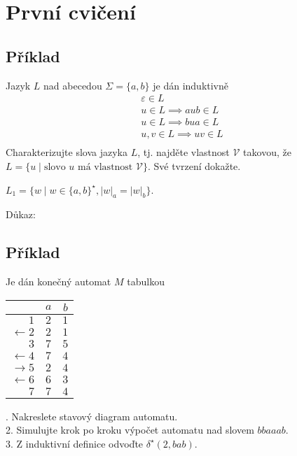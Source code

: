\section{První cvičení}

\subsection{Příklad}
Jazyk $L$ nad abecedou $\Sigma = \{a,b\}$ je dán induktivně
\begin{gather*}
    \varepsilon \in L \\
    u \in L \implies aub \in L\\
    u \in L \implies bua \in L\\
    u, v \in L \implies uv \in L\\
\end{gather*}
Charakterizujte slova jazyka $L$, tj. najděte vlastnost $\mathcal{V}$ takovou, že $L = \{u \mid \text{slovo } u 
\text{ má vlastnost } \mathcal{V}\}$. Své tvrzení dokažte.

$L_1 = \{w \mid w \in \{a,b\}^\star, |w|_a=|w|_b\}$.

\noindent
Důkaz:\\


\newpage
\subsection{Příklad}
Je dán konečný automat $M$ tabulkou


\begin{multicols}{2}


\begin{tabular}{|r|c|c|}
    \hline
    & $a$ & $b$\\
    \hline
    \hline
    $1$            & $2$   & $1$\\
    $\leftarrow 2$ & $2$   & $1$\\
    $3$            & $7$   & $5$\\
    $\leftarrow 4$ & $7$   & $4$\\
    $\rightarrow 5$& $2$   & $4$\\
    $\leftarrow 6$ & $6$   & $3$\\
    $ 7$           & $7$   & $4$\\
    \hline
\end{tabular}

\columnbreak

. Nakreslete stavový diagram automatu.\\
2. Simulujte krok po kroku výpočet automatu nad slovem $bbaaab$.\\
3. Z induktivní definice odvoďte $\delta^\star(2, bab)$.\\

\end{multicols}

